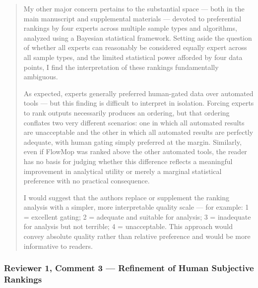 \documentclass[
  11pt,
  a4paper,
]{article}
\begin{document}
\begin{quote}
My other major concern pertains to the substantial space --- both in the
main manuscript and supplemental materials --- devoted to preferential
rankings by four experts across multiple sample types and algorithms,
analyzed using a Bayesian statistical framework. Setting aside the
question of whether all experts can reasonably be considered equally
expert across all sample types, and the limited statistical power
afforded by four data points, I find the interpretation of these
rankings fundamentally ambiguous.

As expected, experts generally preferred human-gated data over automated
tools --- but this finding is difficult to interpret in isolation.
Forcing experts to rank outputs necessarily produces an ordering, but
that ordering conflates two very different scenarios: one in which all
automated results are unacceptable and the other in which all automated
results are perfectly adequate, with human gating simply preferred at
the margin. Similarly, even if FlowMop was ranked above the other
automated tools, the reader has no basis for judging whether this
difference reflects a meaningful improvement in analytical utility or
merely a marginal statistical preference with no practical consequence.

I would suggest that the authors replace or supplement the ranking
analysis with a simpler, more interpretable quality scale --- for
example: 1 = excellent gating; 2 = adequate and suitable for analysis; 3
= inadequate for analysis but not terrible; 4 = unacceptable. This
approach would convey absolute quality rather than relative preference
and would be more informative to readers.
\end{quote}

\subsubsection{Reviewer 1, Comment 3 --- Refinement of Human Subjective
Rankings}\label{reviewer-1-comment-3--refinement-of-human-subjective-rankings}
\end{document}
